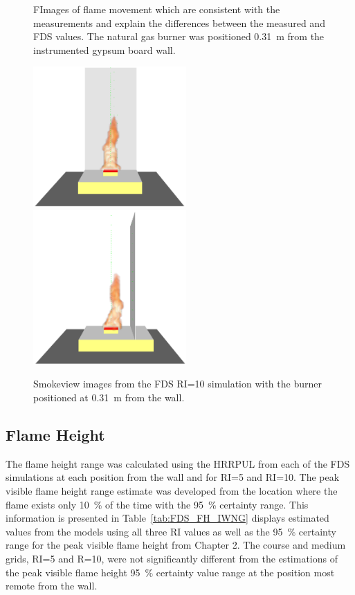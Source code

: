 \documentclass[twoside]{uocthesis}
\begin{document}
{\begin{figure}[ht!]
  \caption[Images of flame movement which are consistent with the measurements and explain the differences between the measured and FDS values.]{FImages of flame movement which are consistent with the measurements and explain the differences between the measured and FDS values.  The natural gas burner was positioned 0.31~m from the instrumented gypsum board wall.}
  \label{FDS_IWNG_Flame_comp}
\end{figure}

\begin{figure}[h]
  \centering
  \includegraphics[width=2.3in]{../Figures/FDS_NG_80kW_GBWall_frontview}
  \includegraphics[width=2.3in]{../Figures/FDS_NG_80kW_GBWall_sideview}   \\
  \caption[Smokeview images from the FDS RI=10 simulation with the burner positioned at 0.31~m from the wall.] {Smokeview images from the FDS RI=10 simulation with the burner positioned at 0.31~m from the wall.}
  \label{FDS_IWNG_SMV_comp}
\end{figure}


\subsection{Flame Height}

The flame height range was calculated using the HRRPUL from each of the FDS simulations at each position from the wall and for RI=5 and RI=10.  The peak visible flame height range estimate was developed from the location where the flame exists only 10~\% of the time with the 95~\% certainty range.  This information is presented in Table~\ref{tab:FDS_FH_IWNG} displays estimated values from the models using all three RI values as well as the 95~$\%$ certainty range for the peak visible flame height from Chapter 2.  The course and medium grids, RI=5 and R=10, were not significantly different from the estimations of the peak visible flame height 95~$\%$ certainty value range at the position most remote from the wall.

}
\end{document}
